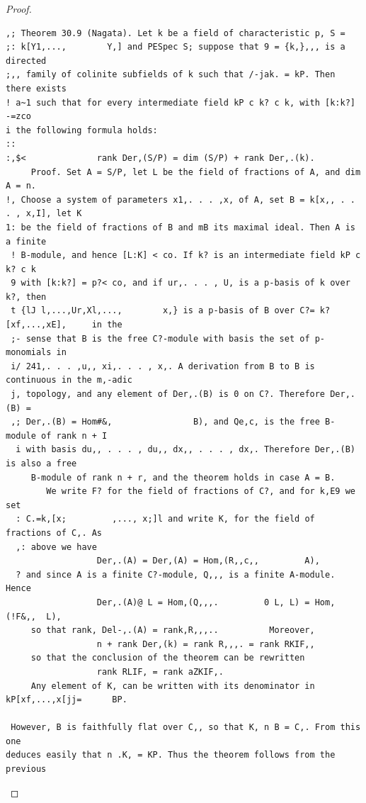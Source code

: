 \begin{proof}
\begin{verbatim}
,; Theorem 30.9 (Nagata). Let k be a field of characteristic p, S =
;: k[Y1,...,        Y,] and PESpec S; suppose that 9 = {k,},,, is a directed
;,, family of colinite subfields of k such that /-jak. = kP. Then there exists
! a~1 such that for every intermediate field kP c k? c k, with [k:k?] -=zco
i the following formula holds:
::
:,$<              rank Der,(S/P) = dim (S/P) + rank Der,.(k).
     Proof. Set A = S/P, let L be the field of fractions of A, and dim A = n.
!, Choose a system of parameters x1,. . . ,x, of A, set B = k[x,, . . . , x,I], let K
1: be the field of fractions of B and mB its maximal ideal. Then A is a finite
 ! B-module, and hence [L:K] < co. If k? is an intermediate field kP c k? c k
 9 with [k:k?] = p?< co, and if ur,. . . , U, is a p-basis of k over k?, then
 t {lJ l,...,Ur,Xl,...,        x,} is a p-basis of B over C?= k?[xf,...,xE],     in the
 ;- sense that B is the free C?-module with basis the set of p-monomials in
 i/ 241,. . . ,u,, xi,. . . , x,. A derivation from B to B is continuous in the m,-adic
 j, topology, and any element of Der,.(B) is 0 on C?. Therefore Der,.(B) =
 ,; Der,.(B) = Hom#&,                B), and Qe,c, is the free B-module of rank n + I
  i with basis du,, . . . , du,, dx,, . . . , dx,. Therefore Der,.(B) is also a free
     B-module of rank n + r, and the theorem holds in case A = B.
        We write F? for the field of fractions of C?, and for k,E9 we set
  : C.=k,[x;         ,..., x;]l and write K, for the field of fractions of C,. As
  ,: above we have
                  Der,.(A) = Der,(A) = Hom,(R,,c,,         A),
  ? and since A is a finite C?-module, Q,,, is a finite A-module. Hence
                  Der,.(A)@ L = Hom,(Q,,,.         0 L, L) = Hom,(!F&,,  L),
     so that rank, Del-,.(A) = rank,R,,,..          Moreover,
                  n + rank Der,(k) = rank R,,,. = rank RKIF,,
     so that the conclusion of the theorem can be rewritten
                  rank RLIF, = rank aZKIF,.
     Any element of K, can be written with its denominator in
kP[xf,...,x[jj=      BP.

 However, B is faithfully flat over C,, so that K, n B = C,. From this one
deduces easily that n .K, = KP. Thus the theorem follows from the previous
\end{verbatim}
\end{proof}


